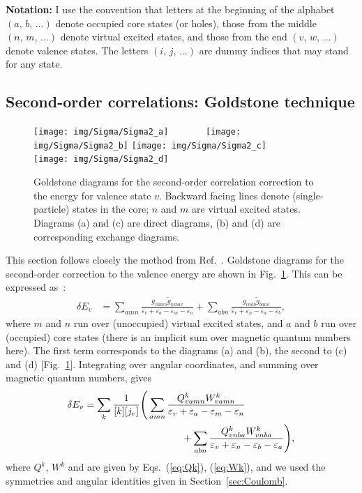 \documentclass[10pt,twocolumn,a4paper]{article}%
\def\en{\ensuremath{\varepsilon}}
\begin{document}
{\bf Notation:} I use the convention that letters at the beginning of the alphabet {${(a,\,b,\,...)}$} denote occupied core states (or holes),
those from the middle {${(n,\,m,\,...)}$} denote virtual excited states, and
those from the end {${(v,\,w,\,...)}$} denote valence states.
The letters {${(i,\,j,\,...)}$} are dummy indices that may stand for any state.



\subsection{Second-order correlations: Goldstone technique}\label{sec:Sigma2-goldstone}

\begin{figure}%
\centering\tiny
\texttt{[image: img/Sigma/Sigma2\_a]}~~~~~~~
\texttt{[image: img/Sigma/Sigma2\_b]}
\texttt{[image: img/Sigma/Sigma2\_c]}~~~~~~~
\texttt{[image: img/Sigma/Sigma2\_d]}
\caption{\small Goldstone diagrams for the second-order correlation correction to the energy for valence state $v$. Backward facing lines denote (single-particle) states in the core; $n$ and $m$ are virtual excited states. Diagrams (a) and (c) are direct diagrams, (b) and (d) are corresponding exchange diagrams.\label{fig:Sigma2}}
\end{figure}

This section follows closely the method from Ref.~\cite{DzubaHFS1984}.
Goldstone diagrams for the second-order correction to the valence energy are shown in Fig.~\ref{fig:Sigma2}.
This can be expressed as~\cite{DzubaHFS1984,JohnsonBook2007}:
\begin{align}\label{eq:dE-SO}
\delta E_v &= 
\sum_{amn}
\frac{g_{vamn}\widetilde g_{nmav}}{\en_v+\en_a - \en_m-\en_n}
+\sum_{abn}
 \frac{g_{vnab}\widetilde g_{banv}}{\en_v+\en_n-\en_a-\en_b}  ,
\end{align}
where $m$ and $n$ run over (unoccupied) virtual excited states, and $a$ and $b$ run over (occupied) core states (there is an implicit sum over magnetic quantum numbers here).
The first term corresponds to the diagrams (a) and (b), the second to (c) and (d) [Fig.~\ref{fig:Sigma2}].
Integrating over angular coordinates, and summing over magnetic quantum numbers, gives~\cite{DzubaHFS1984}
\begin{align}\label{eq:dE-SO-red}
\delta E_v &=\sum_k \frac{1}{[k][j_v]}\Bigg(
 \sum_{amn} \frac{Q^k_{vamn}W^k_{vamn}}{\en_v+\en_a - \en_m-\en_n}
\notag\\&\qquad\qquad\qquad\qquad\qquad
+\sum_{abn}\frac{Q^k_{vnba}W^k_{vnba}}{\en_v+\en_n-\en_b-\en_a} 
 \Bigg),
\end{align}
where $Q^k,\,W^k$ and are given by Eqs.~(\ref{eq:Qk}), (\ref{eq:Wk}), and 
we used the symmetries and angular identities given in Section~\ref{sec:Coulomb}.
\end{document}
